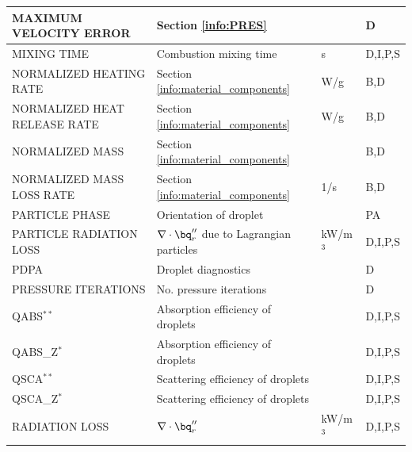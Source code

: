 \documentclass[11pt]{book}
\begin{document}
\begin{longtable}{@{\extracolsep{\fill}}|l|l|l|l|}
{\ct MAXIMUM VELOCITY ERROR}                    & Section \ref{info:PRES}                           &                & D            \\ \hline
{\ct MIXING TIME}                               & Combustion mixing time                            & s              & D,I,P,S      \\ \hline
{\ct NORMALIZED HEATING RATE}                   & Section \ref{info:material_components}            & W/g            & B,D          \\ \hline
{\ct NORMALIZED HEAT RELEASE RATE}              & Section \ref{info:material_components}            & W/g            & B,D          \\ \hline
{\ct NORMALIZED MASS}                           & Section \ref{info:material_components}            &                & B,D          \\ \hline
{\ct NORMALIZED MASS LOSS RATE}                 & Section \ref{info:material_components}            & 1/s            & B,D          \\ \hline
{\ct PARTICLE PHASE}                            & Orientation of droplet                            &                & PA           \\ \hline
{\ct PARTICLE RADIATION LOSS}                   & $\nabla \cdot \bq_r''$ due to Lagrangian particles& kW/m$^3$       & D,I,P,S      \\ \hline
{\ct PDPA}                                      & Droplet diagnostics                               &                & D            \\ \hline
{\ct PRESSURE ITERATIONS}                       & No. pressure iterations                           &                & D            \\ \hline
{\ct QABS}$^{**}$                               & Absorption efficiency of droplets                 &                & D,I,P,S      \\ \hline
{\ct QABS\_Z}$^{*}$                             & Absorption efficiency of droplets                 &                & D,I,P,S      \\ \hline
{\ct QSCA}$^{**}$                               & Scattering efficiency of droplets                 &                & D,I,P,S      \\ \hline
{\ct QSCA\_Z}$^{*}$                             & Scattering efficiency of droplets                 &                & D,I,P,S      \\ \hline
{\ct RADIATION LOSS}                            & $\nabla \cdot \bq_r''$                            & kW/m$^3$       & D,I,P,S      \\ \hline

\end{longtable}
\end{document}
